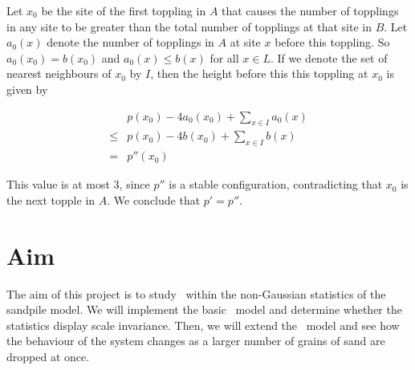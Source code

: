 Let $x_0$ be the site of the first toppling in $A$ that causes the number of topplings in any site to be greater than the total number of topplings at that site in $B$. Let $a_0(x)$ denote the number of topplings in $A$ at site $x$ before this toppling. So $a_0(x_0)=b(x_0)$ and $a_0(x)\le b(x)$ for all $x\in L$. If we denote the set of nearest neighbours of $x_0$ by $I$, then the height before this this toppling at $x_0$ is given by 

\begin{align*}
    &p(x_0) - 4a_0(x_0) +\sum_{x\in I}a_0(x) \\
    \le &p(x_0) - 4b(x_0) +\sum_{x\in I}b(x) \\
    = &p''(x_0)
\end{align*}

This value is at most $3$, since $p''$ is a stable configuration, contradicting that $x_0$ is the next topple in $A$. We conclude that $p'=p''$.


\section{Aim}
The aim of this project is to study \soc\ within the non-Gaussian statistics of the sandpile model. We will implement the basic \btw\ model and determine whether the statistics display scale invariance. Then, we will extend the \btw\ model and see how the behaviour of the system changes as a larger number of grains of sand are dropped at once.





